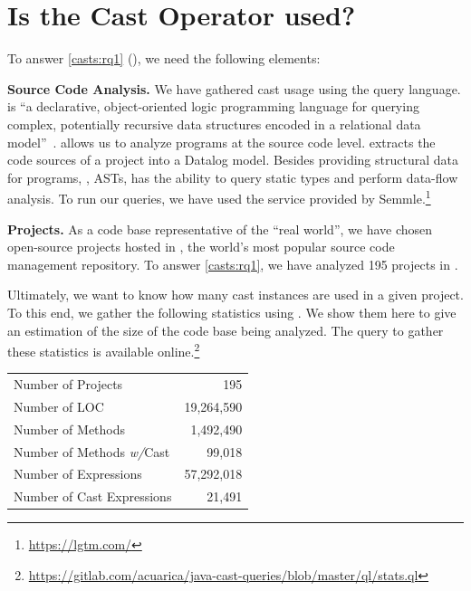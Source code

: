 \section{Is the Cast Operator used?}
\label{sec:casts:stats}

\newcommand{\nproject}{195}
\newcommand{\nloc}{19,264,590}
\newcommand{\nmethod}{1,492,490}
\newcommand{\nmethodwithcast}{99,018}
\newcommand{\nexpr}{57,292,018}
\newcommand{\nCastExpr}{21,491}

\newcommand{\castpercentage}{5.47}

To answer \ref{casts:rq1} (\emph{\crqA}),
we need the following elements:

\textbf{Source Code Analysis.}
We have gathered cast usage using the \ql{} query language.
\ql{} is ``a declarative, object-oriented logic programming language for querying complex, potentially recursive data structures encoded in a relational data model''~\citep{avgustinovQLObjectorientedQueries2016}.
\ql{} allows us to analyze programs at the source code level.
\ql{} extracts the code sources of a project into a Datalog model.
Besides providing structural data for programs, \ie{}, ASTs, \ql{} has the ability to query static types and perform data-flow analysis.
To run our \ql{} queries, we have used the service provided by Semmle.\footnote{\url{https://lgtm.com/}} 

\textbf{Projects.} 
As a code base representative of the ``real world'',
we have chosen open-source projects hosted in \github{},
the world's most popular source code management repository.
To answer \ref{casts:rq1}, we have analyzed \nproject{} \java{} projects in \lgtm{}.

Ultimately, we want to know how many cast instances are used in a given project.
To this end, we gather the following statistics using \ql{}.
We show them here to give an estimation of the size of the code base being analyzed.
The query to gather these statistics is available online.\footnote{\url{https://gitlab.com/acuarica/java-cast-queries/blob/master/ql/stats.ql}}

\begin{center}
\begin{tabular}{lr}
	\hline
	Number of Projects & \nproject \\
	Number of LOC & \nloc{} \\
	Number of Methods & \nmethod \\
	Number of Methods \emph{w/}Cast & \nmethodwithcast \\
    Number of Expressions & \nexpr \\
    Number of Cast Expressions & \nCastExpr \\
	\hline
\end{tabular}
\end{center}

